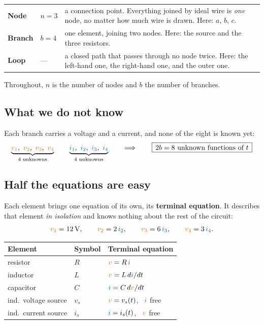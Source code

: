 \documentclass[11pt,a4paper]{article}
\newcommand{\Icol}[1]{\textcolor{ccur}{#1}}
\newcommand{\Vcol}[1]{\textcolor{cvolt}{#1}}
\begin{document}
\begin{center}
\small
\begin{tabular}{@{}l l p{10.4cm}@{}}
\toprule
\textbf{Node}   & $n = 3$ & a connection point. Everything joined by ideal wire is
                  \emph{one} node, no matter how much wire is drawn.
                  Here: $a$, $b$, $c$.\\
\textbf{Branch} & $b = 4$ & one element, joining two nodes. Here: the source and the three
                  resistors.\\
\textbf{Loop}   & --- & a closed path that passes through no node twice. Here: the
                  left-hand one, the right-hand one, and the outer one.\\
\bottomrule
\end{tabular}
\end{center}

Throughout, $n$ is the number of nodes and $b$ the number of branches.

\subsection{What we do not know}
Each branch carries a \Vcol{voltage} and a \Icol{current}, and none of the eight is
known yet:
\[
  \underbrace{\Vcol{v_1},\ \Vcol{v_2},\ \Vcol{v_3},\ \Vcol{v_4}}_{\text{4 unknowns}}
  \qquad
  \underbrace{\Icol{i_1},\ \Icol{i_2},\ \Icol{i_3},\ \Icol{i_4}}_{\text{4 unknowns}}
  \qquad\Longrightarrow\qquad
  \boxed{\,2b = 8 \text{ unknown functions of } t\,}
\]

\subsection{Half the equations are easy}

Each element brings one equation of its own, its \textbf{terminal equation}. It describes
that element \emph{in isolation} and knows nothing about the rest of the circuit:
\[
  \Vcol{v_1} = 12\V, \qquad
  \Vcol{v_2} = 2\,\Icol{i_2}, \qquad
  \Vcol{v_3} = 6\,\Icol{i_3}, \qquad
  \Vcol{v_4} = 3\,\Icol{i_4} .
\]

\begin{center}
\small
\begin{tabular}{@{}l l l@{}}
\toprule
\textbf{Element} & \textbf{Symbol} & \textbf{Terminal equation}\\
\midrule
resistor             & $R$   & $\Vcol{v} = R\,\Icol{i}$\\
inductor             & $L$   & $\Vcol{v} = L\,d\Icol{i}/dt$\\
capacitor            & $C$   & $\Icol{i} = C\,d\Vcol{v}/dt$\\
ind.\ voltage source & $v_s$ & $\Vcol{v} = v_s(t)$, \ $\Icol{i}$ free\\
ind.\ current source & $i_s$ & $\Icol{i} = i_s(t)$, \ $\Vcol{v}$ free\\
\bottomrule
\end{tabular}
\end{center}
\end{document}
